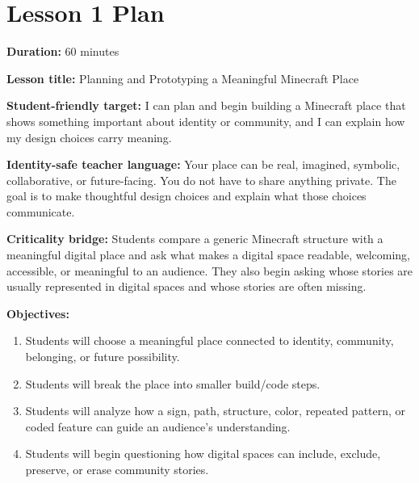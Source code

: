 \newpage
\section*{Lesson 1 Plan}

\textbf{Duration:} 60 minutes

\textbf{Lesson title:} Planning and Prototyping a Meaningful Minecraft Place

\textbf{Student-friendly target:} I can plan and begin building a Minecraft place that shows something important about identity or community, and I can explain how my design choices carry meaning.

\textbf{Identity-safe teacher language:} Your place can be real, imagined, symbolic, collaborative, or future-facing. You do not have to share anything private. The goal is to make thoughtful design choices and explain what those choices communicate.

\textbf{Criticality bridge:} \textcolor{LessonTwoAccent}{Students compare a generic Minecraft structure with a meaningful digital place and ask what makes a digital space readable, welcoming, accessible, or meaningful to an audience. They also begin asking whose stories are usually represented in digital spaces and whose stories are often missing.}

\textbf{Objectives:}
\begin{enumerate}[leftmargin=*]
    \item Students will choose a meaningful place connected to identity, community, belonging, or future possibility.
    \item Students will break the place into smaller build/code steps.
    \item Students will analyze how a sign, path, structure, color, repeated pattern, or coded feature can guide an audience's understanding.
    \item Students will begin questioning how digital spaces can include, exclude, preserve, or erase community stories.
\end{enumerate}

